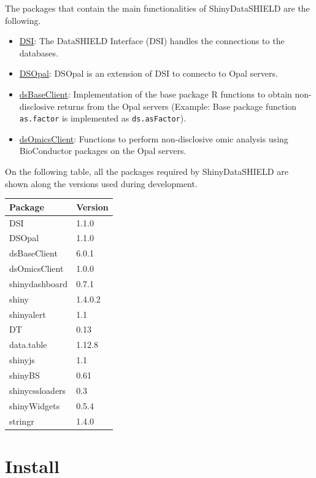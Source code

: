 \documentclass[
]{book}
\providecommand{\tightlist}{%
  \setlength{\itemsep}{0pt}\setlength{\parskip}{0pt}}
\begin{document}
The packages that contain the main functionalities of ShinyDataSHIELD are the following.

\begin{itemize}
\tightlist
\item
  \href{https://github.com/datashield/DSI}{DSI}: The DataSHIELD Interface (DSI) handles the connections to the databases.
\item
  \href{https://github.com/datashield/DSOpal}{DSOpal}: DSOpal is an extension of DSI to connecto to Opal servers.
\item
  \href{https://github.com/datashield/dsBaseClient}{dsBaseClient}: Implementation of the base package R functions to obtain non-disclosive returns from the Opal servers (Example: Base package function \texttt{as.factor} is implemented as \texttt{ds.asFactor}).
\item
  \href{https://github.com/isglobal-brge/dsOmicsClient}{dsOmicsClient}: Functions to perform non-disclosive omic analysis using BioConductor packages on the Opal servers.
\end{itemize}

On the following table, all the packages required by ShinyDataSHIELD are shown along the versions used during development.

\begin{longtable}[]{@{}ll@{}}
\toprule
Package & Version \\
\midrule
\endhead
DSI & 1.1.0 \\
DSOpal & 1.1.0 \\
dsBaseClient & 6.0.1 \\
dsOmicsClient & 1.0.0 \\
shinydashboard & 0.7.1 \\
shiny & 1.4.0.2 \\
shinyalert & 1.1 \\
DT & 0.13 \\
data.table & 1.12.8 \\
shinyjs & 1.1 \\
shinyBS & 0.61 \\
shinycssloaders & 0.3 \\
shinyWidgets & 0.5.4 \\
stringr & 1.4.0 \\
\bottomrule
\end{longtable}

\hypertarget{install}{%
\section{Install}\label{install}}
\end{document}
